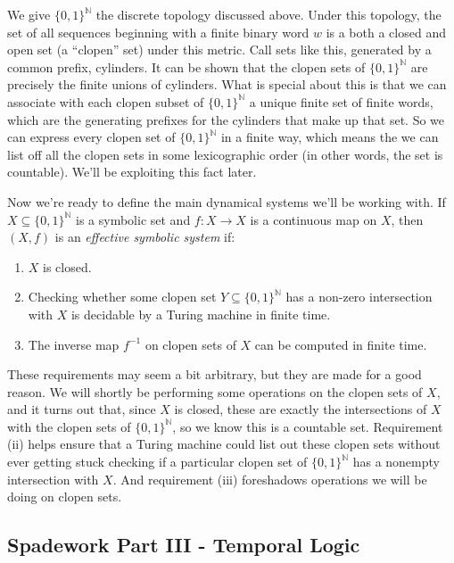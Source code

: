 \documentclass{fkpaper}
\renewcommand{\Nn}{\mathbb{N}}
\begin{document}
\begin{multicols}{2}
  We give $\{0,1\}^\Nn$ the discrete topology discussed above. Under
  this topology, the set of all sequences beginning with a finite binary
  word $w$ is a both a closed and open set (a ``clopen'' set) under this
  metric. Call sets like this, generated by a common prefix, cylinders.
  It can be shown that the clopen sets of $\{0,1\}^\Nn$ are precisely
  the finite unions of cylinders. What is special about this is that we
  can associate with each clopen subset of $\{0,1\}^\Nn$ a unique finite
  set of finite words, which are the generating prefixes for the
  cylinders that make up that set. So we can express every clopen set of
  $\{0,1\}^\Nn$ in a finite way, which means the we can list off all the
  clopen sets in some lexicographic order (in other words, the set is
  countable). We'll be exploiting this fact later.

  Now we're ready to define the main dynamical systems we'll be working
  with. If $X \subseteq \{0,1\}^\Nn$ is a symbolic set and $f: X \to X$
  is a continuous map on $X$, then $(X, f)$ is an {\it effective
    symbolic system} if:
  \begin{enumerate}[label=(\roman*)]
    \item $X$ is closed.
    \item Checking whether some clopen set $Y \subseteq \{0,1\}^\Nn$ has
      a non-zero intersection with $X$ is decidable by a Turing machine
      in finite time.
    \item The inverse map $f^{-1}$ on clopen sets of $X$ can be computed
      in finite time.
  \end{enumerate}

  These requirements may seem a bit arbitrary, but they are made for a
  good reason. We will shortly be performing some operations on the
  clopen sets of $X$, and it turns out that, since $X$ is closed, these
  are exactly the intersections of $X$ with the clopen sets of
  $\{0,1\}^\Nn$, so we know this is a countable set. Requirement (ii)
  helps ensure that a Turing machine could list out these clopen sets
  without ever getting stuck checking if a particular clopen set of
  $\{0,1\}^\Nn$ has a nonempty intersection with $X$. And requirement
  (iii) foreshadows operations we will be doing on clopen sets.

  \subsection{Spadework Part III - Temporal Logic}


\end{multicols}
\end{document}
